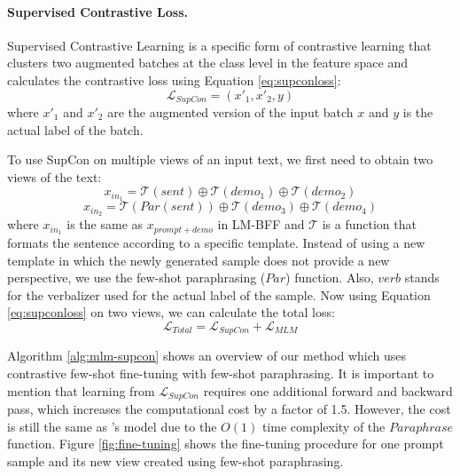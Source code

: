 \documentclass[11pt]{article}
\begin{document}
\paragraph{Supervised Contrastive Loss.}
Supervised Contrastive Learning is a specific form of contrastive learning \cite{chen2020simple, tian2020contrastive, liu2021bootstrapping} that clusters two augmented batches at the class level in the feature space and calculates the contrastive loss using Equation \ref{eq:supconloss}:
\begin{equation}
    \label{eq:supconloss}
    \mathcal{L}_{SupCon}=(x'_1, x'_2, y)
\end{equation}
where $x'_1$ and $x'_2$ are the augmented version of the input batch $x$ and $y$ is the actual label of the batch.

To use SupCon on multiple views of an input text, we first need to obtain two views of the text:
\begin{equation}
   x_{in_1}=\mathcal{T}(sent) \oplus \mathcal{T}(demo_1) \oplus \mathcal{T}(demo_2)
\end{equation}
\begin{equation}
   x_{in_2}=\mathcal{T}(Par(sent)) \oplus \mathcal{T}(demo_3) \oplus \mathcal{T}(demo_4) 
\end{equation}
where $x_{in_1}$ is the same as $x_{prompt+demo}$ in LM-BFF and $\mathcal{T}$ is a function that formats the sentence according to a specific template. Instead of using a new template in which the newly generated sample does not provide a new perspective, we use the few-shot paraphrasing ($Par$) function. Also, $verb$ stands for the verbalizer used for the actual label of the sample. Now using Equation \ref{eq:supconloss} on two views, we can calculate the total loss:
\begin{equation}
    \mathcal{L}_{Total}=\mathcal{L}_{SupCon} + \mathcal{L}_{MLM}
\end{equation}

Algorithm \ref{alg:mlm-supcon} shows an overview of our method which uses contrastive few-shot fine-tuning with few-shot paraphrasing. It is important to mention that learning from $\mathcal{L}_{SupCon}$ requires one additional forward and backward pass, which increases the computational cost by a factor of 1.5. However, the cost is still the same as 's model due to the $O(1)$ time complexity of the $Paraphrase$ function. Figure \ref{fig:fine-tuning} shows the fine-tuning procedure for one prompt sample and its new view created using few-shot paraphrasing.
\end{document}
